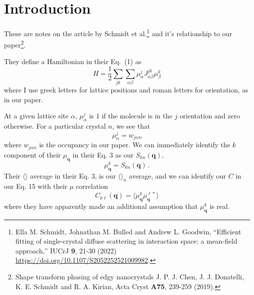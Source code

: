\documentclass[12pt]{article}
\begin{document}
\let\xxxhat\hat
\let\xxxvec\vec
\renewcommand{\hat}[1]{{\boldsymbol {\xxxhat {#1}} }}
\renewcommand{\vec}[1]{\boldsymbol {#1}}


\section{Introduction}
These are
notes on the article by Schmidt et al.\footnote{
Ella M. Schmidt, Johnathan M. Bulled and Andrew L. Goodwin,
 ``Efficient fitting of single-crystal diffuse scattering in
interaction space: a mean-field approach,'' IUCrJ {\bf 9}, 21-30 (2022)
\url{https://doi.org/10.1107/S2052252521009982}.
}
and it's relationship to our paper\footnote{
Shape transform phasing of edgy nanocrystals
J. P. J. Chen, J. J. Donatelli, K. E. Schmidt and R. A. Kirian,
Acta Cryst {\bf A75}, 239-259 (2019).
}.


They define a Hamiltonian in their Eq.\ (1) as
\begin{equation}
H = \frac{1}{2} \sum_{jk} \sum_{\alpha\beta} \mu^j_\alpha J_{\alpha\beta}^{jk}
\mu_\beta^k
\end{equation}
where I use
greek letters for lattice positions and roman letters for orientation,
as in our paper.

At a given lattice site $\alpha$, $\mu_\alpha^j$
is $1$ if the molecule is in the $j$
orientation and zero otherwise. For a particular crystal $n$, we see that
\begin{equation}
\mu^j_\alpha = w_{j\alpha n}
\end{equation}
where $w_{j\alpha n}$ is the occupancy in our paper. We can immediately
identify the $k$ component of their $\mu_{\vec q}$ in their Eq. 3
as our $S_{kn}(\vec q)$,
\begin{equation}
\mu^k_{\vec q} = S_{kn}(\vec q) \,.
\end{equation}
Their $\langle \rangle$ average in their Eq. 3, is our $\langle \rangle_n$
average, and we can identify our $C$ in our Eq. 15
with their $\mu$ correlation
\begin{equation}
C_{k\ell}(\vec q) = \langle \mu^{k}_{\vec q} \mu^{\ell *}_{\vec q}\rangle
\end{equation}
where they have apparently made an additional assumption that 
$\mu^k_{\vec q}$ is real.
\end{document}
